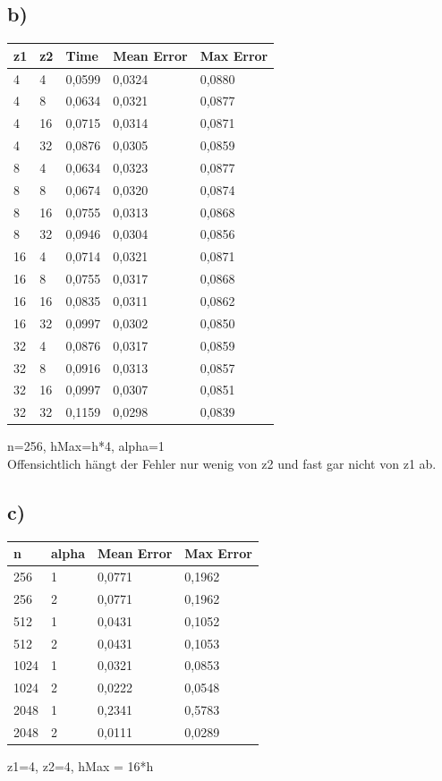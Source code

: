 \documentclass[paper = a4]{scrartcl}
\begin{document}
\subsection*{b)}
\begin{tabular}{l|l|l|l|l}
\hline
z1 & z2 & Time   & Mean Error & Max Error\\
\hline
4  & 4  & 0,0599 & 0,0324     & 0,0880   \\
4  & 8  & 0,0634 & 0,0321     & 0,0877   \\
4  & 16 & 0,0715 & 0,0314     & 0,0871   \\
4  & 32 & 0,0876 & 0,0305     & 0,0859   \\
8  & 4  & 0,0634 & 0,0323     & 0,0877   \\
8  & 8  & 0,0674 & 0,0320     & 0,0874   \\
8  & 16 & 0,0755 & 0,0313     & 0,0868   \\
8  & 32 & 0,0946 & 0,0304     & 0,0856   \\
16 & 4  & 0,0714 & 0,0321     & 0,0871   \\
16 & 8  & 0,0755 & 0,0317     & 0,0868   \\
16 & 16 & 0,0835 & 0,0311     & 0,0862   \\
16 & 32 & 0,0997 & 0,0302     & 0,0850   \\
32 & 4  & 0,0876 & 0,0317     & 0,0859   \\
32 & 8  & 0,0916 & 0,0313     & 0,0857   \\
32 & 16 & 0,0997 & 0,0307     & 0,0851   \\
32 & 32 & 0,1159 & 0,0298     & 0,0839   \\
\hline
\end{tabular}
n=256, hMax=h*4, alpha=1\\

Offensichtlich hängt der Fehler nur wenig von z2 und fast gar nicht von z1 ab.

\subsection*{c)}
\begin{tabular}{l|l|l|l}
\hline
n    & alpha & Mean Error & Max Error \\
\hline
256  & 1     & 0,0771     & 0,1962 \\
256  & 2     & 0,0771     & 0,1962 \\
512  & 1     & 0,0431     & 0,1052 \\
512  & 2     & 0,0431     & 0,1053 \\
1024 & 1     & 0,0321     & 0,0853 \\
1024 & 2     & 0,0222     & 0,0548 \\
2048 & 1     & 0,2341     & 0,5783 \\
2048 & 2     & 0,0111     & 0,0289 \\
\hline
\end{tabular}
z1=4, z2=4, hMax = 16*h\\
\end{document}
